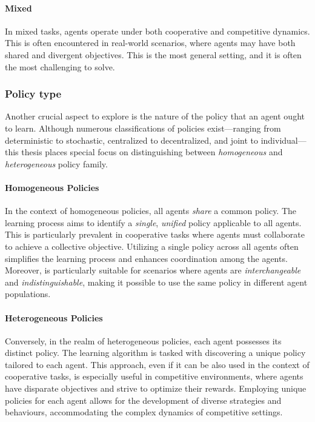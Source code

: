 \paragraph*{Mixed}
In mixed tasks, agents operate under both cooperative and competitive dynamics. 
 This is often encountered in real-world scenarios, 
 where agents may have both shared and divergent objectives. 
This is the most general setting, and it is often the most challenging to solve.
\subsubsection{Policy type}
Another crucial aspect to explore is the nature of the policy that an agent ought to learn. 
Although numerous classifications of policies exist---ranging from deterministic to stochastic, centralized to decentralized, and joint to individual---this thesis places special focus on distinguishing between \emph{homogeneous} and \emph{heterogeneous} policy family.

\paragraph*{Homogeneous Policies}
In the context of homogeneous policies, 
 all agents \emph{share} a common policy. 
 The learning process aims to identify a \emph{single}, \emph{unified} policy applicable to all agents. 
 This is particularly prevalent in cooperative tasks where agents must collaborate to achieve a collective objective. 
 Utilizing a single policy across all agents often simplifies the learning process and enhances coordination among the agents.
 Moreover, is particularly suitable for scenarios where agents are \emph{interchangeable} and \emph{indistinguishable}, 
 making it possible to use the same policy in different agent populations.
\paragraph*{Heterogeneous Policies}
Conversely, in the realm of heterogeneous policies, 
 each agent possesses its distinct policy. 
 The learning algorithm is tasked with discovering a unique policy tailored to each agent. 
 This approach, even if it can be also used in the context of cooperative tasks, 
 is especially useful in competitive environments, 
 where agents have disparate objectives and strive to optimize their rewards. 
 Employing unique policies for each agent allows for the development of diverse strategies and behaviours, 
 accommodating the complex dynamics of competitive settings.

